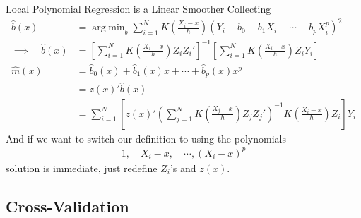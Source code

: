 \documentclass[aspectratio=169, handout]{beamer}
\DeclareMathOperator*{\argmin}{arg\;min}
\newcommand{\sumiN}{\sum^N_{i=1}}
\begin{document}
{\footnotesize
\begin{frame}{Local Polynomial Regression is a Linear Smoother}
Collecting
\begin{align*}
  \widehat{b}(x)
  &=
  \argmin_b
  \sumiN
  K\left(
  \frac{X_i-x}{h}
  \right)
  (Y_i-b_0-b_1X_i-\cdots-b_pX_i^p)^2
  \\
  \implies\quad
  \widehat{b}(x)
  &=
  \left[
  \sumiN
  K\left(
  \frac{X_i-x}{h}
  \right)
  Z_iZ_i'
  \right]^{-1}
  \left[
  \sumiN
  K\left(
  \frac{X_i-x}{h}
  \right)
  Z_iY_i
  \right]
  \\
  \widehat{m}(x)
  &=
  \widehat{b}_0(x)
  +
  \widehat{b}_1(x)
  x
  +
  \cdots+
  \widehat{b}_p(x)
  x^p
  \\
  &=
  z(x)'\widehat{b}(x)
  \\
  &=
  \sumiN
  \left[
  z(x)'
  \left(
  \sum_{j=1}^N
  K\left(
  \frac{X_j-x}{h}
  \right)
  Z_jZ_j'
  \right)^{-1}
  K\left(
  \frac{X_i-x}{h}
  \right)
  Z_i
  \right]
  Y_i
\end{align*}
And if we want to switch our definition to using the polynomials
\begin{align*}
  1,\quad
  X_i-x,\quad
  \cdots,
  (X_i-x)^p
\end{align*}
solution is immediate, just redefine $Z_i$'s and $z(x)$.
\end{frame}
}



\subsection{Cross-Validation}
\end{document}
